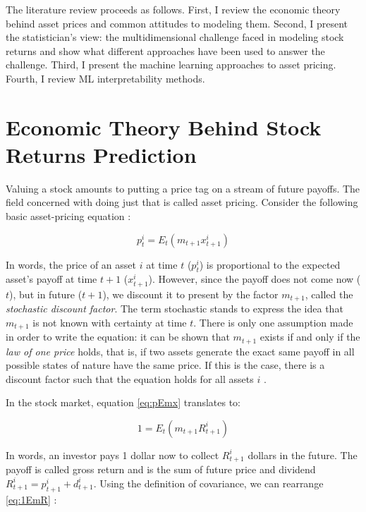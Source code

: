  	The literature review proceeds as follows. First, I review the economic theory behind asset prices and common attitudes to modeling them. Second, I present the statistician's view: the multidimensional challenge faced in modeling stock returns \citep{cochrane2011presidential} and show what different approaches have been used to answer the challenge. Third, I present the machine learning approaches to asset pricing. Fourth, I review ML interpretability methods. 
 	
 	\section{Economic Theory Behind Stock Returns Prediction}
 	
	 	Valuing a stock amounts to putting a price tag on a stream of future payoffs. The field concerned with doing just that is called asset pricing. Consider the following basic asset-pricing equation \citep{cochrane2009asset}:
	 	
	 	\begin{equation}
	 		p_t^i = E_t(m_{t+1} x_{t+1}^i ) \label{eq:pEmx}
	 	\end{equation}
	 	
	 	In words, the price of an asset $i$ at time $t$ ($p_t^i$) is proportional to the expected asset's payoff at time $t+1$ ($x_{t+1}^i$). However, since the payoff does not come now ($t$), but in future ($t+1$), we discount it to present by the factor $m_{t+1}$, called the \textit{stochastic discount factor}. The term stochastic stands to express the idea that $m_{t+1}$ is not known with certainty at time $t$. There is only one assumption made in order to write the equation: it can be shown that $m_{t+1}$ exists if and only if the \textit{law of one price} holds, that is, if two assets generate the exact same payoff in all possible states of nature have the same price. If this is the case, there is a discount factor such that the equation holds for all assets $i$ \citep{cochrane2009asset}.
	 	
	 	In the stock market, equation \ref{eq:pEmx} translates to:
	 	
	 	\begin{equation}
	 		1 = E_t(m_{t+1} R_{t+1}^i ) \label{eq:1EmR}
	 	\end{equation} 
	 	
	 	In words, an investor pays 1 dollar now to collect $R_{t+1}^i$ dollars in the future. The payoff is called gross return and is the sum of future price and dividend $R_{t+1}^i = p_{t+1}^i+ d_{t+1}^i$. 
	 	Using the definition of covariance, we can rearrange \ref{eq:1EmR} \citep{cochrane2009asset}:
	 	
